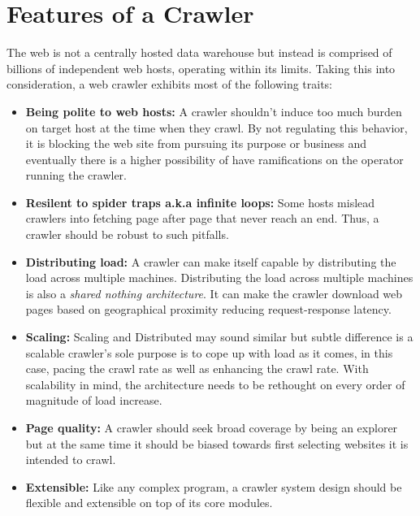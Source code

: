 \pagebreak

\section{Features of a Crawler}
The web is not a centrally hosted data warehouse but instead is comprised of billions of independent
web hosts, operating within its limits. Taking this into consideration, a web crawler exhibits most of the
following traits:

\begin{itemize}
\item \textbf{Being polite to web hosts:} A crawler shouldn't induce too much burden on target host
  at the time when they crawl. By not regulating this behavior, it is blocking the web site from pursuing
  its purpose or business and eventually there is a higher possibility of have ramifications on the
  operator running the crawler.
\item \textbf{Resilent to spider traps a.k.a infinite loops:} Some hosts mislead crawlers into fetching page after page that
  never reach an end. Thus, a crawler should be robust to such pitfalls.
\item \textbf{Distributing load:} A crawler can make itself capable by distributing the load across
  multiple machines. Distributing the load across multiple machines is also a \textit{shared nothing
    architecture}. It can make the crawler download web pages based on geographical proximity reducing
  request-response latency.
\item \textbf{Scaling:} Scaling and Distributed may sound similar but subtle difference is a scalable
  crawler's sole purpose is to cope up with load as it comes, in this case, pacing the crawl rate as well
  as enhancing the crawl rate. With scalability in mind, the architecture needs to be rethought on every
  order of magnitude of load increase.
\item \textbf{Page quality:} A crawler should seek broad coverage by being an explorer but at the same
  time it should be biased towards first selecting websites it is intended to crawl.
\item \textbf{Extensible:} Like any complex program, a crawler system design should be flexible and
  extensible on top of its core modules.
\end{itemize}

\pagebreak